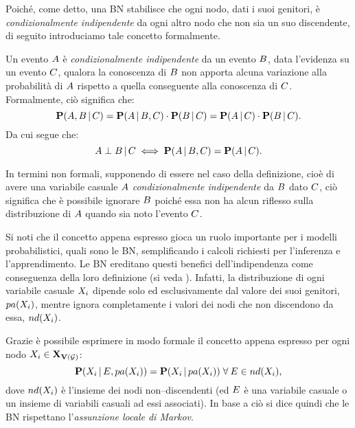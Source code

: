Poiché, come detto, una \acl{BN} stabilisce che ogni nodo, dati i suoi genitori, è \emph{condizionalmente indipendente} da ogni altro nodo che non sia un suo discendente, di seguito introduciamo tale concetto formalmente.
\begin{definizione}\label{defn:ic}
Un evento $\mathnormal{A}$ è \emph{condizionalmente indipendente} da un evento $\mathnormal{B}$, data l'evidenza su un evento $\mathnormal{C}$, qualora la conoscenza di $\mathnormal{B}$ non apporta alcuna variazione alla probabilità di $\mathnormal{A}$ rispetto a quella conseguente alla conoscenza di $\mathnormal{C}$.
Formalmente, ciò significa che:
\[
\mathbf{P}(\mathnormal{A},\mathnormal{B}\,\arrowvert\,\mathnormal{C})=\mathbf{P}(\mathnormal{A}\,\arrowvert\,\mathnormal{B},\mathnormal{C})\cdot\mathbf{P}(\mathnormal{B}\,\arrowvert\,\mathnormal{C})=\mathbf{P}(\mathnormal{A}\,\arrowvert\,\mathnormal{C})\cdot\mathbf{P}(\mathnormal{B}\,\arrowvert\,\mathnormal{C})\text{.}
\]
Da cui segue che:
\[
\mathnormal{A}\perp\mathnormal{B}\,\arrowvert\,\mathnormal{C}\iff\mathbf{P}(\mathnormal{A}\,\arrowvert\,\mathnormal{B},\mathnormal{C})=\mathbf{P}(\mathnormal{A}\,\arrowvert\,\mathnormal{C})\text{.}
\]
\end{definizione}
In termini non formali, supponendo di essere nel caso della definizione, cioè di avere una variabile casuale $\mathnormal{A}$ \emph{condizionalmente indipendente} da $\mathnormal{B}$ dato $\mathnormal{C}$, ciò significa che è possibile ignorare $\mathnormal{B}$ poiché essa non ha alcun riflesso sulla distribuzione \cond*{} di $\mathnormal{A}$ quando sia noto l'evento $\mathnormal{C}$.

Si noti che il concetto appena espresso gioca un ruolo importante per i modelli probabilistici, quali sono le \acl{BN}, semplificando i calcoli richiesti per l'inferenza e l'apprendimento. Le \acl{BN} ereditano questi benefici dell'indipendenza \cond*{} come conseguenza della loro definizione (si veda ). Infatti, la distribuzione \cond*{} di ogni variabile casuale $\mathnormal{X_i}$ dipende solo ed esclusivamente dal valore dei suoi genitori, $pa(\mathnormal{X_i})$, mentre ignora completamente i valori dei nodi che non discendono da essa, $nd(\mathnormal{X_i})$.

Grazie  è possibile esprimere in modo formale il concetto appena espresso per ogni nodo $\mathnormal{X_i}\in\mathbf{X}_{\mathbf{V}(\mathcal{G})}$:
\[
\mathbf{P}(\mathnormal{X_i}\,\arrowvert\,\mathnormal{E},pa(\mathnormal{X_i}))=\mathbf{P}(\mathnormal{X_i}\,\arrowvert\,pa(\mathnormal{X_i}))\;\forall\:\mathnormal{E}\in nd(\mathnormal{X_i})\text{,}
\]
dove $nd(\mathnormal{X_i})$ è l'insieme dei nodi non--discendenti (ed $\mathnormal{E}$ è una variabile casuale o un insieme di variabili casuali ad essi associati).
In base a ciò si dice quindi che le \acl{BN} rispettano l'\emph{assunzione locale di Markov}.

